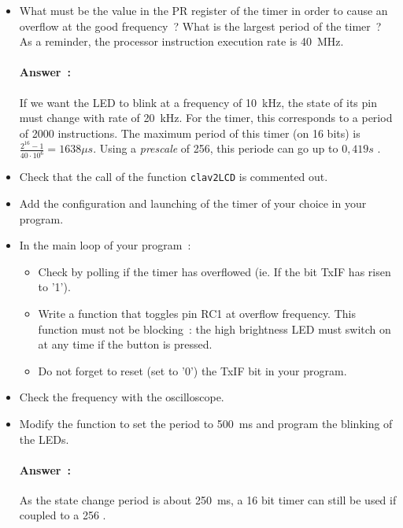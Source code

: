 \documentclass[11pt,a4paper]{article}
\theoremstyle{definition}%
\newcommand{\reponse}[1]{%
	\ifthenelse {\boolean{corrige}} {\paragraph{Answer~:} \color{darkblue}   #1\color{black}} {}
 }
\begin{document}
\begin{itemize}
	\item What must be the value in the PR register of the timer in order to cause an overflow at the good frequency~?
    What is the largest period of the timer~? As a reminder, the processor instruction execution rate is 40~MHz.
	\reponse{
		If we want the LED to blink at a frequency of 10~kHz, the state of its pin must change with rate of 20~kHz. For the timer, this corresponds to a period of 2000 instructions. The maximum period of this timer (on 16 bits) is $\frac{2^{16}-1}{40\cdot10^6} = 1638 \mu s$. Using a \textit{prescale} of 256, this periode can go up to $0,419 s$ .
	}
	\item Check that the call of the function \texttt{clav2LCD} is commented out.
	\item Add the configuration and launching of the timer of your choice in your program.
	\item In the main loop of your program~:
	\begin{itemize}
		\item Check by polling if the timer has overflowed (ie. If the bit TxIF has risen to '1').
		\item Write a function that toggles pin RC1 at overflow frequency. This function must not be blocking~: the high brightness LED must switch on at any time if the button is pressed.
		\item Do not forget to reset (set to '0') the TxIF bit in your program.
	\end{itemize}
	\item Check the frequency with the oscilloscope.
	\item Modify the function to set the period to 500~ms and program the blinking of the LEDs.
	\reponse{
		As the state change period is about 250~ms, a 16 bit timer can still be used if coupled to a 256 \textif{prescaler}.
	}
\end{itemize}
\end{document}
